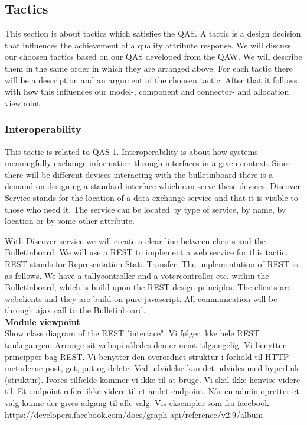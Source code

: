 \subsection{Tactics}
This section is about tactics which satisfies the QAS. A tactic is a design decision that influences the achievement of a quality attribute response. We will discuss our choosen tactics based on our QAS developed from the QAW. We will describe them in the same order in which they are arranged above. For each tactic there will be a description and an argument of the choosen tactic. After that it follows with how this influences our model-, component and connector- and allocation viewpoint. 


\noindent
\subsubsection{Interoperability}
This tactic is related to QAS 1. Interoperability is about how systems meaningfully exchange information through interfaces in a given context. Since there will be different devices interacting with the bulletinboard there is a demand on designing a standard interface which can serve these devices. Discover Service stands for the location of a data exchange service and that it is visible to those who need it. The service can be located by type of service, by name, by location or by some other attribute.


\begin{center}
\end{center}


\noindent
With Discover service we will create a clear line between clients and the Bulletinboard. We will use a REST to implement a web service for this tactic.\\

\noindent
REST stands for Representation State Transfer. The implementation of REST is as follows. We have a tallycontroller and a votercontroller etc. within the Bulletinboard, which is build upon the REST design principles. The clients are webclients and they are build on pure javascript. All communcation will be through ajax call to the Bulletinboard.\\


\noindent
\textbf{Module viewpoint}\\
Show class diagram of the REST "interface". Vi følger ikke hele REST tankegangen. Arrange sit webapi således den er nemt tilgængelig. Vi benytter principper bag REST. Vi benytter den overordnet struktur i forhold til HTTP metoderne post, get, put og delete. Ved udvidelse kan det udvides med hyperlink (struktur). Ivores tilfælde kommer vi ikke til at bruge. Vi skal ikke henvise videre til. Et endpoint refere ikke videre til et andet endpoint. Når en admin opretter et valg kunne der gives adgang til alle valg. Vis eksempler som fra facebook https://developers.facebook.com/docs/graph-api/reference/v2.9/album \\

